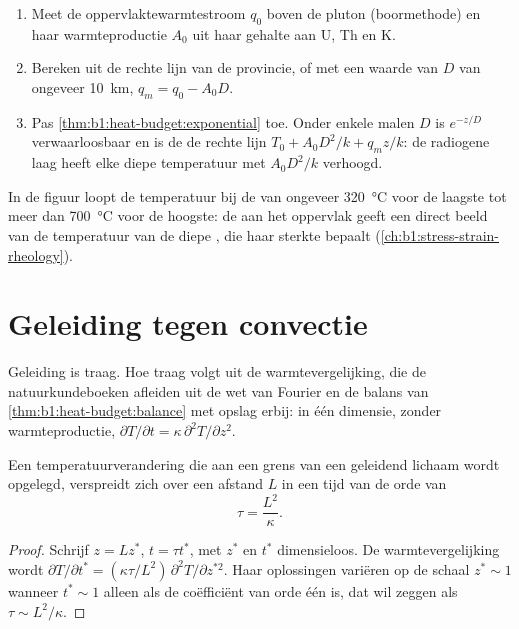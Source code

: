 \begin{method}\label{met:b1:heat-budget:moho}
\begin{enumerate}
  \item Meet de oppervlaktewarmtestroom $q_0$ boven de pluton (boormethode) en haar warmteproductie $A_0$ uit haar gehalte aan U, Th en K.
  \item Bereken uit de rechte lijn van de provincie, of met een waarde van $D$ van ongeveer \qty{10}{km}, $q_m = q_0 - A_0 D$.
  \item Pas \cref{thm:b1:heat-budget:exponential} toe. Onder enkele malen $D$ is $e^{-z/D}$ verwaarloosbaar en is de  de rechte lijn $T_0 + A_0D^2/k + q_m z/k$: de radiogene laag heeft elke diepe temperatuur met $A_0D^2/k$ verhoogd.
\end{enumerate}
\end{method}

In de figuur loopt de temperatuur bij de  van ongeveer \qty{320}{\degreeCelsius} voor de laagste  tot meer dan \qty{700}{\degreeCelsius} voor de hoogste: de  aan het oppervlak geeft een direct beeld van de temperatuur van de diepe , die haar sterkte bepaalt (\cref{ch:b1:stress-strain-rheology}).

\section{Geleiding tegen convectie}

Geleiding is traag. Hoe traag volgt uit de warmtevergelijking, die de natuurkundeboeken afleiden uit de wet van Fourier en de balans van \cref{thm:b1:heat-budget:balance} met opslag erbij: in één dimensie, zonder warmteproductie,
$\partial T/\partial t = \kappa\,\partial^2 T/\partial z^2$.

\begin{proposition}\label{prop:b1:heat-budget:timescale}
Een temperatuurverandering die aan een grens van een geleidend lichaam wordt opgelegd, verspreidt zich over een afstand $L$ in een tijd van de orde van
\[
  \tau = \frac{L^2}{\kappa} .
\]
\end{proposition}

\begin{proof}
Schrijf $z = L z^*$, $t = \tau t^*$, met $z^*$ en $t^*$ dimensieloos. De warmtevergelijking wordt $\partial T/\partial t^* = (\kappa\tau/L^2)\,\partial^2
T/\partial z^{*2}$. Haar oplossingen variëren op de schaal $z^* \sim 1$ wanneer $t^* \sim 1$ alleen als de coëfficiënt van orde één is, dat wil zeggen als $\tau \sim L^2/\kappa$.
\end{proof}

